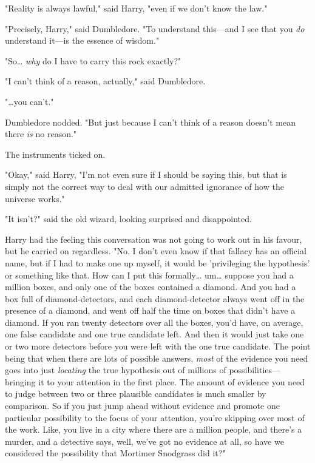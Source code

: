 "Reality is always lawful," said Harry, "even if we don't know the law."

"Precisely, Harry," said Dumbledore. "To understand this---and I see that you 
\emph{do} understand it---is the essence of wisdom."

"So{\ldots} \emph{why} do I have to carry this rock exactly?"

"I can't think of a reason, actually," said Dumbledore.

"{\ldots}you can't."

Dumbledore nodded. "But just because I can't think of a reason doesn't mean 
there \emph{is} no reason."

The instruments ticked on.

"Okay," said Harry, "I'm not even sure if I should be saying this, but that is 
simply not the correct way to deal with our admitted ignorance of how the 
universe works."

"It isn't?" said the old wizard, looking surprised and disappointed.

Harry had the feeling this conversation was not going to work out in his 
favour, but he carried on regardless. "No. I don't even know if that fallacy 
has an official name, but if I had to make one up myself, it would be 
'privileging the hypothesis' or something like that. How can I put this 
formally{\ldots} um{\ldots} suppose you had a million boxes, and only one of 
the boxes contained a diamond. And you had a box full of diamond-detectors, and 
each diamond-detector always went off in the presence of a diamond, and went 
off half the time on boxes that didn't have a diamond. If you ran twenty 
detectors over all the boxes, you'd have, on average, one false candidate and 
one true candidate left. And then it would just take one or two more detectors 
before you were left with the one true candidate. The point being that when 
there are lots of possible answers, \emph{most} of the evidence you need goes 
into just \emph{locating} the true hypothesis out of millions of 
possibilities---bringing it to your attention in the first place. The amount of 
evidence you need to judge between two or three plausible candidates is much 
smaller by comparison. So if you just jump ahead without evidence and promote 
one particular possibility to the focus of your attention, you're skipping over 
most of the work. Like, you live in a city where there are a million people, 
and there's a murder, and a detective says, well, we've got no evidence at all, 
so have we considered the possibility that Mortimer Snodgrass did it?"

